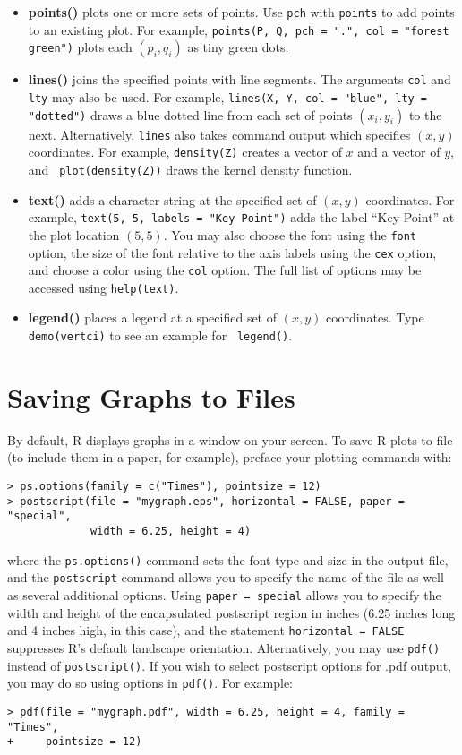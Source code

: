 \begin{itemize}
\item \textbf{points()} plots one or more sets of points.  Use
  \texttt{pch} with \texttt{points} to add points to an existing plot.
  For example, \texttt{points(P, Q, pch = ".", col = "forest green")}
  plots each $(p_i, q_i)$ as tiny green dots.
\item \textbf{lines()} joins the specified points with line segments.
  The arguments \texttt{col} and \texttt{lty} may also be used.  For
  example, \texttt{lines(X, Y, col = "blue", lty = "dotted")} draws a
  blue dotted line from each set of points $(x_i, y_i)$ to the next.
  Alternatively, \texttt{lines} also takes command output which
  specifies $(x, y)$ coordinates.  For example, \texttt{density(Z)}
  creates a vector of $x$ and a vector of $y$, and {\tt
    plot(density(Z))} draws the kernel density function.  
\item \textbf{text()} adds a character string at the specified set of
  $(x,y)$ coordinates.  For example, {\tt text(5, 5, labels = "Key
    Point")} adds the label ``Key Point'' at the plot location
  $(5,5)$.  You may also choose the font using the {\tt font} option,
  the size of the font relative to the axis labels using the {\tt cex}
  option, and choose a color using the {\tt col} option.  The full
  list of options may be accessed using {\tt help(text)}.   
\item \textbf{legend()} places a legend at a specified set of $(x,y)$
  coordinates.  Type {\tt demo(vertci)} to see an example for {\tt
    legend()}.  
\end{itemize}

\section{Saving Graphs to Files}\label{ss:output}

By default, R displays graphs in a window on your screen.  To save R
plots to file (to include them in a paper, for example), preface your
plotting commands with:
\begin{verbatim}
> ps.options(family = c("Times"), pointsize = 12)
> postscript(file = "mygraph.eps", horizontal = FALSE, paper = "special",
             width = 6.25, height = 4)
\end{verbatim}
where the \texttt{ps.options()} command sets the font type and size in
the output file, and the \texttt{postscript} command allows you to
specify the name of the file as well as several additional options.
Using {\tt paper = special} allows you to specify the width and height
of the encapsulated postscript region in inches (6.25 inches long and
4 inches high, in this case), and the statement \texttt{horizontal =
  FALSE} suppresses R's default landscape orientation.  Alternatively,
you may use {\tt pdf()} instead of {\tt postscript()}.  If you wish to
select postscript options for .pdf output, you may do so using options
in {\tt pdf()}.  For example:
\begin{verbatim}
> pdf(file = "mygraph.pdf", width = 6.25, height = 4, family = "Times", 
+     pointsize = 12)
\end{verbatim}

